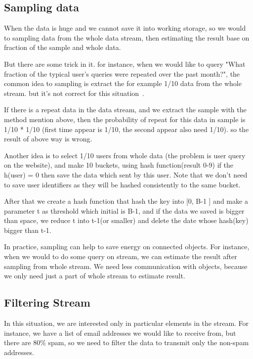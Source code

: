 \documentclass{report}
\begin{document}
\subsection{Sampling data}

When the data is huge and we cannot save it into working storage, so we would to sampling data from the whole data stream, then estimating the result base on fraction of the sample and whole data.

But there are some trick in it. for instance, when we would like to query "What fraction of the typical user's queries were repeated over the past month?", the common idea to sampling is extract the for example 1/10 data from the whole stream. but it's not correct for this situation~\cite{leskovec2014mining}.

If there is a repeat data in the data stream, and we extract the sample with the method mention above, then the probability of repeat for this data in sample is 1/10 * 1/10 (first time appear is 1/10, the second appear also need 1/10). so the result of above way is wrong.

Another idea is to select 1/10 users from whole data (the problem is user query on the website), and make 10 buckets, using hash function(result 0-9) if the h(user) = 0 then save the data which sent by this user. Note that we don't need to save user identifiers as they will be hashed consistently to the same bucket.

After that we create a hash function that hash the key into [0, B-1 ] 
and make a parameter t as threshold which initial is B-1, and if the data we saved is bigger than space, we reduce t into t-1(or smaller) and  delete the date whose hash(key) bigger than t-1.
\cite{leskovec2014mining}

In practice, sampling can help to save energy on connected objects. For instance, when we would to do some query on stream, we can estimate the result after sampling from whole stream. We need less communication with objects, because we only need just a part of whole stream to estimate result.  

\subsection{Filtering Stream}

In this situation, we are interested only in particular elements in the stream. For instance, we have a list of email addresses we would like to receive from, but there are 80\% spam, so we need to filter the data to transmit only the non-spam addresses. 
\end{document}
